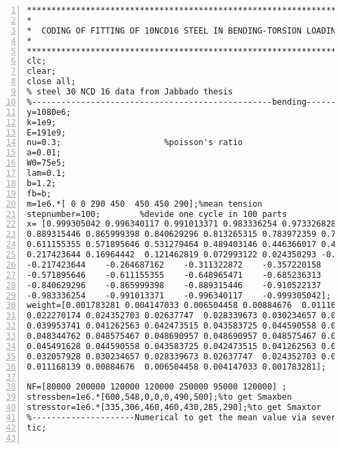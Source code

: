 \clearpage
\begin{lstlisting}[numbers=left, numberstyle=\tiny, keywordstyle=\color{blue!100}, commentstyle=\color{red!30!green!100!blue!100}, frame=shadowbox, rulesepcolor=\color{red!20!green!20!blue!20}]
***********************************************************************
*
*  CODING OF FITTING OF 10NCD16 STEEL IN BENDING-TORSION LOADING WITH MEAN STRESS
*               
***********************************************************************
clc;
clear;
close all;
% steel 30 NCD 16 data from Jabbado thesis
%-------------------------------------------------bending--------------------------------
y=1080e6;
k=1e9;
E=191e9;
nu=0.3;                     %poisson's ratio
a=0.01;
W0=75e5;
lam=0.1;
b=1.2;
fb=b;
m=1e6.*[ 0 0 290 450  450 450 290];%mean tension
stepnumber=100;        %devide one cycle in 100 parts
x= [0.999305042	0.996340117	0.991013371	0.983336254	0.973326828	0.9610088	0.946411375	0.929569172	0.910522137...
0.889315446	0.865999398	0.840629296	0.813265315	0.783972359	0.752819907	0.71988185	0.685236313	0.648965471...
0.611155355	0.571895646	0.531279464	0.489403146	0.446366017	0.402270158	0.357220158	0.311322872	0.264687162...
0.217423644	0.16964442	0.121462819	0.072993122	0.024350293	-0.024350293	-0.072993122	-0.121462819	-0.16964442...
-0.217423644	-0.264687162	-0.311322872	-0.357220158	-0.402270158	-0.446366017	-0.489403146	-0.531279464...
-0.571895646	-0.611155355	-0.648965471	-0.685236313	-0.71988185	-0.752819907	-0.783972359	-0.813265315...
-0.840629296	-0.865999398	-0.889315446	-0.910522137	-0.929569172	-0.946411375	-0.9610088	-0.973326828...
-0.983336254	-0.991013371	-0.996340117	-0.999305042];
weight=[0.001783281	0.004147033	0.006504458	0.00884676	0.011168139	0.013463048	0.01572603	0.017951716	0.020134823...
0.022270174	0.024352703	0.02637747	0.028339673	0.030234657	0.032057928	0.033805162	0.035472213	0.037055129	0.038550153...
0.039953741	0.041262563	0.042473515	0.043583725	0.044590558	0.045491628	0.046284797	0.046968183	0.047540166	0.047999389...
0.048344762	0.048575467	0.048690957	0.048690957	0.048575467	0.048344762	0.047999389	0.047540166	0.046968183	0.046284797...
0.045491628	0.044590558	0.043583725	0.042473515	0.041262563	0.039953741	0.038550153	0.037055129	0.035472213	0.033805162...
0.032057928	0.030234657	0.028339673	0.02637747	0.024352703	0.022270174	0.020134823	0.017951716	0.01572603	0.013463048...
0.011168139	0.00884676	0.006504458	0.004147033	0.001783281];

NF=[80000 200000 120000 120000 250000 95000 120000] ;
stressben=1e6.*[600,548,0,0,0,490,500];%to get Smaxben
stresstor=1e6.*[335,306,460,460,430,285,290];%to get Smaxtor
%---------------------Numerical to get the mean value via several cycles-----------------------------
tic;


\end{lstlisting}
